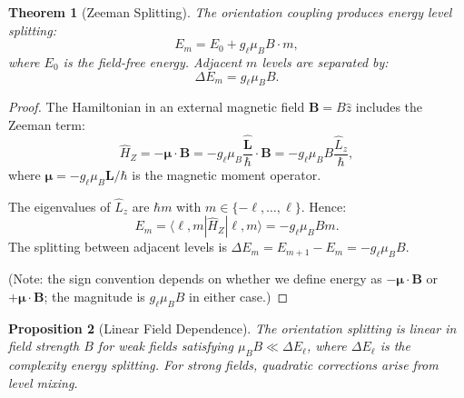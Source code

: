 \documentclass[twocolumn,10pt,a4paper]{article}
\newtheorem{theorem}{Theorem}[section]
\newtheorem{proposition}[theorem]{Proposition}
\theoremstyle{remark}
\begin{document}
\begin{theorem}[Zeeman Splitting]
\label{thm:zeeman}
The orientation coupling produces energy level splitting:
\begin{equation}
E_m = E_0 + g_\ell \mu_B B \cdot m,
\end{equation}
where $E_0$ is the field-free energy. Adjacent $m$ levels are separated by:
\begin{equation}
\Delta E_m = g_\ell \mu_B B.
\end{equation}
\end{theorem}

\begin{proof}
The Hamiltonian in an external magnetic field $\mathbf{B} = B\hat{z}$ includes the Zeeman term:
\begin{equation}
\hat{H}_Z = -\boldsymbol{\mu} \cdot \mathbf{B} = -g_\ell \mu_B \frac{\hat{\mathbf{L}}}{\hbar} \cdot \mathbf{B} = -g_\ell \mu_B B \frac{\hat{L}_z}{\hbar},
\end{equation}
where $\boldsymbol{\mu} = -g_\ell \mu_B \mathbf{L}/\hbar$ is the magnetic moment operator.

The eigenvalues of $\hat{L}_z$ are $\hbar m$ with $m \in \{-\ell, \ldots, \ell\}$. Hence:
\begin{equation}
E_m = \langle \ell, m | \hat{H}_Z | \ell, m \rangle = -g_\ell \mu_B B m.
\end{equation}
The splitting between adjacent levels is $\Delta E_m = E_{m+1} - E_m = -g_\ell \mu_B B$.

(Note: the sign convention depends on whether we define energy as $-\boldsymbol{\mu} \cdot \mathbf{B}$ or $+\boldsymbol{\mu} \cdot \mathbf{B}$; the magnitude is $g_\ell \mu_B B$ in either case.)
\end{proof}

\begin{proposition}[Linear Field Dependence]
\label{prop:linear_field}
The orientation splitting is linear in field strength $B$ for weak fields satisfying $\mu_B B \ll \Delta E_\ell$, where $\Delta E_\ell$ is the complexity energy splitting. For strong fields, quadratic corrections arise from level mixing.
\end{proposition}
\end{document}
